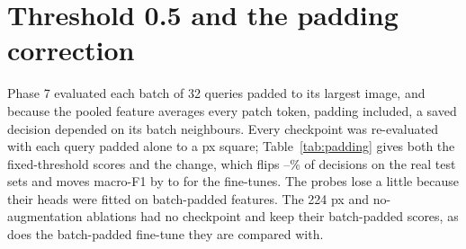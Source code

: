 \appendix
\section{Threshold 0.5 and the padding correction}
\label{sec:appendix}

Phase 7 evaluated each batch of 32 queries padded to its largest image, and because the pooled feature averages every patch token, padding included, a saved decision depended on its batch neighbours. Every checkpoint was re-evaluated with each query padded alone to a  px square; Table~\ref{tab:padding} gives both the fixed-threshold scores and the change, which flips \padChangedMinPct--\padChangedMaxPct\% of decisions on the real test sets and moves macro-F1 by \padGainMin{} to \padGainMax{} for the fine-tunes. The probes lose a little because their heads were fitted on batch-padded features. The 224 px and no-augmentation ablations had no checkpoint and keep their batch-padded scores, as does the batch-padded fine-tune they are compared with.

